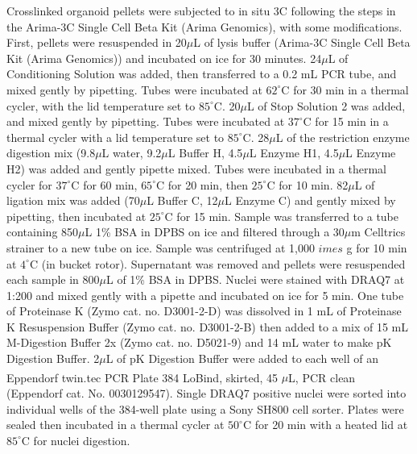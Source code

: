 Crosslinked organoid pellets were subjected to in situ 3C following the steps in the Arima-3C Single Cell Beta Kit (Arima Genomics), with some modifications. First, pellets were resuspended in 20\ensuremath{\mu}L of lysis buffer (Arima-3C Single Cell Beta Kit (Arima Genomics)) and incubated on ice for 30 minutes. 24\ensuremath{\mu}L of Conditioning Solution was added, then transferred to a 0.2 mL PCR tube, and mixed gently by pipetting. Tubes were incubated at \ensuremath{62^{\circ}}C for 30 min in a thermal cycler, with the lid temperature set to \ensuremath{85^{\circ}}C. 20\ensuremath{\mu}L of Stop Solution 2 was added, and mixed gently by pipetting. Tubes were incubated at \ensuremath{37^{\circ}}C for 15 min in a thermal cycler with a lid temperature set to \ensuremath{85^{\circ}}C. 28\ensuremath{\mu}L of the restriction enzyme digestion mix (9.8\ensuremath{\mu}L water, 9.2\ensuremath{\mu}L Buffer H, 4.5\ensuremath{\mu}L Enzyme H1, 4.5\ensuremath{\mu}L Enzyme H2) was added and gently pipette mixed. Tubes were incubated in a thermal cycler for \ensuremath{37^{\circ}}C for 60 min, \ensuremath{65^{\circ}}C for 20 min, then \ensuremath{25^{\circ}}C for 10 min. 82\ensuremath{\mu}L of ligation mix was added (70\ensuremath{\mu}L Buffer C, 12\ensuremath{\mu}L Enzyme C) and gently mixed by pipetting, then incubated at \ensuremath{25^{\circ}}C for 15 min. Sample was transferred to a tube containing 850\ensuremath{\mu}L 1\% BSA in DPBS on ice and filtered through a 30\ensuremath{\mu}m Celltrics strainer to a new tube on ice. Sample was centrifuged at 1,000 \ensuremath{	imes} g for 10 min at \ensuremath{4^{\circ}}C (in bucket rotor). Supernatant was removed and pellets were resuspended each sample in 800\ensuremath{\mu}L of 1\% BSA in DPBS. Nuclei were stained with DRAQ7 at 1:200 and mixed gently with a pipette and incubated on ice for 5 min. One tube of Proteinase K (Zymo cat. no. D3001-2-D) was dissolved in 1 mL of Proteinase K Resuspension Buffer (Zymo cat. no. D3001-2-B) then added to a mix of 15 mL M-Digestion Buffer 2x (Zymo cat. no. D5021-9) and 14 mL water to make pK Digestion Buffer. 2\ensuremath{\mu}L of pK Digestion Buffer were added to each well of an Eppendorf twin.tec\textsuperscript{\textregistered} PCR Plate 384 LoBind\textsuperscript{\textregistered}, skirted, 45 \ensuremath{\mu}L, PCR clean (Eppendorf cat. No. 0030129547). Single DRAQ7 positive nuclei were sorted into individual wells of the 384-well plate using a Sony SH800 cell sorter. Plates were sealed then incubated in a thermal cycler at \ensuremath{50^{\circ}}C for 20 min with a heated lid at \ensuremath{85^{\circ}}C for nuclei digestion.

